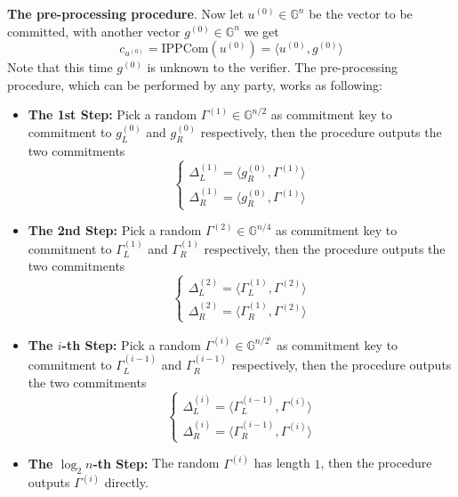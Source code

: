 \documentclass{article}
\begin{document}
\textbf{The pre-processing procedure}. Now let $u^{(0)} \in \mathbb{G}^n$ be the vector to be committed, with another vector $g^{(0)} \in \mathbb{G}^n$ we get 
\begin{equation*}
c_{u^{(0)}} = \text{IPPCom}(u^{(0)}) = \langle u^{(0)}, g^{(0)} \rangle
\end{equation*} 
Note that this time $g^{(0)}$ is unknown to the verifier. The pre-processing procedure, which can be performed by any party, works as following: 
\begin{itemize}
\item \textbf{The 1st Step: } Pick a random $\Gamma^{(1)} \in \mathbb{G}^{n/2}$ as commitment key to commitment to $g^{(0)}_L$ and $g^{(0)}_R$ respectively, then the procedure outputs the two commitments
\begin{equation*}
\begin{cases}
\Delta_L^{(1)} = \langle g^{(0)}_R, \Gamma^{(1)} \rangle \\
\Delta_R^{(1)} = \langle g^{(0)}_R, \Gamma^{(1)} \rangle
\end{cases}
\end{equation*}
\item \textbf{The 2nd Step: } Pick a random $\Gamma^{(2)} \in \mathbb{G}^{n/4}$ as commitment key to commitment to $\Gamma^{(1)}_L$ and $\Gamma^{(1)}_R$ respectively, then the procedure outputs the two commitments
\begin{equation*}
\begin{cases}
\Delta_L^{(2)} = \langle \Gamma^{(1)}_L, \Gamma^{(2)} \rangle \\
\Delta_R^{(2)} = \langle \Gamma^{(1)}_R, \Gamma^{(2)} \rangle
\end{cases}
\end{equation*}
\item \textbf{The $i$-th Step: } Pick a random $\Gamma^{(i)} \in \mathbb{G}^{n/2^{i}}$ as commitment key to commitment to $\Gamma^{(i-1)}_L$ and $\Gamma^{(i-1)}_R$ respectively, then the procedure outputs the two commitments
\begin{equation*}
\begin{cases}
\Delta_L^{(i)} = \langle \Gamma^{(i-1)}_L, \Gamma^{(i)} \rangle \\
\Delta_R^{(i)} = \langle \Gamma^{(i-1)}_R, \Gamma^{(i)} \rangle
\end{cases}
\end{equation*}
\item \textbf{The $\log_2 n$-th Step: } The random $\Gamma^{(i)}$ has length $1$, then the procedure outputs $\Gamma^{(i)}$ directly. 
\end{itemize}
\end{document}
